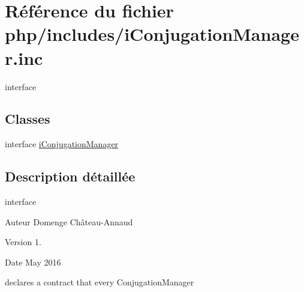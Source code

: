 \hypertarget{i_conjugation_manager_8inc}{}\section{Référence du fichier php/includes/i\+Conjugation\+Manager.inc}
\label{i_conjugation_manager_8inc}


interface  


\subsection*{Classes}
\begin{DoxyCompactItemize}
\item 
interface \hyperlink{interfacei_conjugation_manager}{i\+Conjugation\+Manager}
\end{DoxyCompactItemize}


\subsection{Description détaillée}
interface 

\begin{DoxyAuthor}{Auteur}
Domenge Château-\/\+Annaud 
\end{DoxyAuthor}
\begin{DoxyVersion}{Version}
1. 
\end{DoxyVersion}
\begin{DoxyDate}{Date}
May 2016
\end{DoxyDate}
declares a contract that every Conjugation\+Manager 
